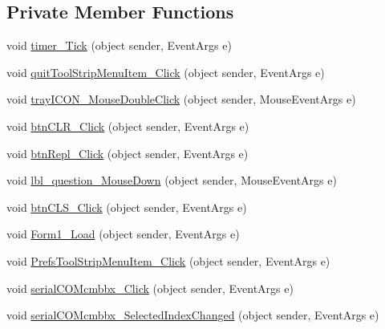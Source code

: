 \subsection*{\-Private \-Member \-Functions}
\begin{DoxyCompactItemize}
\item 
void \hyperlink{class_sr_p___classroom_inq_1_1frm_classrrom_inq_a07132b1925da00a6b4673e893f719465}{timer\-\_\-\-Tick} (object sender, \-Event\-Args e)
\item 
void \hyperlink{class_sr_p___classroom_inq_1_1frm_classrrom_inq_a1f6806f1c728c11daf09a988688026d5}{quit\-Tool\-Strip\-Menu\-Item\-\_\-\-Click} (object sender, \-Event\-Args e)
\item 
void \hyperlink{class_sr_p___classroom_inq_1_1frm_classrrom_inq_a7ec6569db6ff275c78bd80bd50646610}{tray\-I\-C\-O\-N\-\_\-\-Mouse\-Double\-Click} (object sender, \-Mouse\-Event\-Args e)
\item 
void \hyperlink{class_sr_p___classroom_inq_1_1frm_classrrom_inq_a5577422488a2959e7e039a95d85506cd}{btn\-C\-L\-R\-\_\-\-Click} (object sender, \-Event\-Args e)
\item 
void \hyperlink{class_sr_p___classroom_inq_1_1frm_classrrom_inq_a65ba92a7bf3839c796abc965f5524b0f}{btn\-Repl\-\_\-\-Click} (object sender, \-Event\-Args e)
\item 
void \hyperlink{class_sr_p___classroom_inq_1_1frm_classrrom_inq_a58eac2c8a22afb14b3090a1cdd73ea1b}{lbl\-\_\-question\-\_\-\-Mouse\-Down} (object sender, \-Mouse\-Event\-Args e)
\item 
void \hyperlink{class_sr_p___classroom_inq_1_1frm_classrrom_inq_a39589edc035bae2c2775afcea57d2798}{btn\-C\-L\-S\-\_\-\-Click} (object sender, \-Event\-Args e)
\item 
void \hyperlink{class_sr_p___classroom_inq_1_1frm_classrrom_inq_ac71625cc47c0a4bfa92bd4f83e8c7bb6}{\-Form1\-\_\-\-Load} (object sender, \-Event\-Args e)
\item 
void \hyperlink{class_sr_p___classroom_inq_1_1frm_classrrom_inq_abce1cb97617c664a4d967eed8c5f9c86}{\-Prefs\-Tool\-Strip\-Menu\-Item\-\_\-\-Click} (object sender, \-Event\-Args e)
\item 
void \hyperlink{class_sr_p___classroom_inq_1_1frm_classrrom_inq_a07401ed0357e442240346cc777bf5acd}{serial\-C\-O\-Mcmbbx\-\_\-\-Click} (object sender, \-Event\-Args e)
\item 
void \hyperlink{class_sr_p___classroom_inq_1_1frm_classrrom_inq_aadea414ad99ecd09aa912edabf105448}{serial\-C\-O\-Mcmbbx\-\_\-\-Selected\-Index\-Changed} (object sender, \-Event\-Args e)

\end{DoxyCompactItemize}
